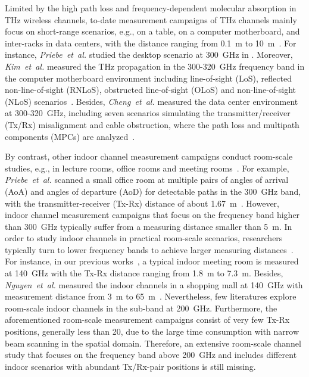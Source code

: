 \documentclass[journal,12pt,draftclsnofoot,onecolumn]{IEEEtran}
\begin{document}
Limited by the high path loss and frequency-dependent molecular absorption in THz wireless channels, to-date measurement campaigns of THz channels mainly focus on short-range scenarios, e.g., on a table, on a computer motherboard, and inter-racks in data centers, with the distance ranging from 0.1~m to 10~m~\cite{priebe2011channel,kim2016characterization,song2020channel,eckhardt2019measurements,cheng2020thz,fu2020modeling,xing2019indoor}.
For instance, \textit{Priebe~et~al.} studied the desktop scenario at 300~GHz in \cite{priebe2011channel}. Moreover, \textit{Kim~et~al.} measured the THz propagation in the 300-320~GHz frequency band in the computer motherboard environment including line-of-sight (LoS), reflected non-line-of-sight (RNLoS), obstructed line-of-sight (OLoS) and non-line-of-sight (NLoS) scenarios~\cite{kim2016characterization}. Besides, \textit{Cheng~et~al.} measured the data center environment at 300-320~GHz, including seven scenarios simulating the transmitter/receiver (Tx/Rx) misalignment and cable obstruction, where the path loss and multipath components (MPCs) are analyzed~\cite{cheng2020thz}.
\par By contrast, other indoor channel measurement campaigns conduct room-scale studies, e.g., in lecture rooms, office rooms and meeting rooms~\cite{priebe2011channel,xing2018propagation,Nguyen2018Comparing,ju2021millimeter,yu2020wideband,yi2021Channel,he2021channel,chen2021channel}. 
For example, \textit{Priebe~et~al.} scanned a small office room at multiple pairs of angles of arrival (AoA) and angles of departure (AoD) for detectable paths in the 300~GHz band, with the transmitter-receiver (Tx-Rx) distance of about 1.67~m~\cite{priebe2011channel}.
However, indoor channel measurement campaigns that focus on the frequency band higher than 300~GHz typically suffer from a measuring distance smaller than 5~m. In order to study indoor channels in practical room-scale scenarios, researchers typically turn to lower frequency bands to achieve larger measuring distances~\cite{abbasi2020channel,Nguyen2018Comparing}.
For instance, in our previous works~\cite{chen2021channel,yu2020wideband}, a typical indoor meeting room is measured at 140~GHz with the Tx-Rx distance ranging from 1.8~m to 7.3~m. Besides, \textit{Nguyen~et~al.} measured the indoor channels in a shopping mall at 140~GHz with measurement distance from 3~m to 65~m~\cite{Nguyen2018Comparing}.
Nevertheless, few literatures explore room-scale indoor channels in the sub-band at 200~GHz. Furthermore, the aforementioned room-scale measurement campaigns consist of very few Tx-Rx positions, generally less than 20, due to the large time consumption with narrow beam scanning in the spatial domain. Therefore, an extensive room-scale channel study that focuses on the frequency band above 200~GHz and includes different indoor scenarios with abundant Tx/Rx-pair positions is still missing.
\end{document}
